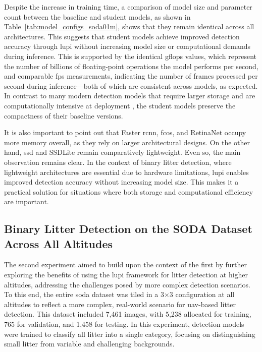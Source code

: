 Despite the increase in training time, a comparison of model size and parameter count between the baseline and student models, as shown in Table~\ref{tab:model_configs_soda01m}, shows that they remain identical across all architectures. This suggests that student models achieve improved detection accuracy through \gls{lupi} without increasing model size or computational demands during inference. This is supported by the identical \gls{gflops} values, which represent the number of billions of floating-point operations the model performs per second, and comparable \gls{fps} measurements, indicating the number of frames processed per second during inference—both of which are consistent across models, as expected. In contrast to many modern detection models that require larger storage and are computationally intensive at deployment \cite{detr, rt-detr, rt-detrv2, rf-detr}, the student models preserve the compactness of their baseline versions.

It is also important to point out that Faster \gls{rcnn}, \gls{fcos}, and RetinaNet occupy more memory overall, as they rely on larger architectural designs. On the other hand, \gls{ssd} and SSDLite remain comparatively lightweight. Even so, the main observation remains clear. In the context of binary litter detection, where lightweight architectures are essential due to hardware limitations, \gls{lupi} enables improved detection accuracy without increasing model size. This makes it a practical solution for situations where both storage and computational efficiency are important.

\subsection{Binary Litter Detection on the SODA Dataset Across All Altitudes}
\label{subsec:5_soda_tiled_single_dataset_exp}

The second experiment aimed to build upon the context of the first by further exploring the benefits of using the \gls{lupi} framework for litter detection at higher altitudes, addressing the challenges posed by more complex detection scenarios. To this end, the entire \gls{soda} dataset was tiled in a 3$\times$3 configuration at all altitudes to reflect a more complex, real-world scenario for \gls{uav}-based litter detection. This dataset included 7,461 images, with 5,238 allocated for training, 765 for validation, and 1,458 for testing. In this experiment, detection models were trained to classify all litter into a single category, focusing on distinguishing small litter from variable and challenging backgrounds.

